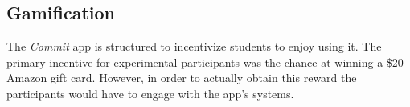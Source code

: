 \subsection{Gamification}
\par The \textit{Commit} app is structured to incentivize students to enjoy using it. The primary incentive for experimental participants was the chance at winning a \$20 Amazon gift card. However, in order to actually obtain this reward the participants would have to engage with the app's systems.
